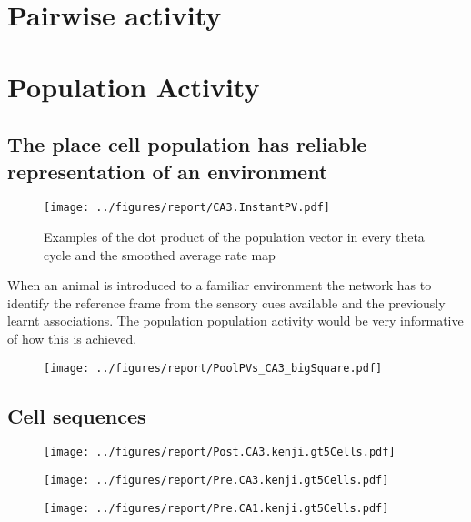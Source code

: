 \section{Pairwise activity}

\section{Population Activity}
\subsection*{The place cell population has reliable representation of an environment}

\begin{figure}[htb!]
\centering
\texttt{[image: ../figures/report/CA3.InstantPV.pdf]}
\caption{Examples of the dot product of the population vector in every theta cycle and the smoothed average rate map}
\end{figure}
When an animal is introduced to a familiar environment the network has to identify the reference frame from the sensory cues available and the previously learnt associations. The population population activity would be very informative of how this is achieved.

\begin{figure}[htb!]
\centering
\texttt{[image: ../figures/report/PoolPVs\_CA3\_bigSquare.pdf]}
\caption{}
\end{figure}

\subsection*{Cell sequences}
\begin{figure}[htb!]
\centering
\texttt{[image: ../figures/report/Post.CA3.kenji.gt5Cells.pdf]}
\caption{}
\end{figure}

\begin{figure}[htb!]
\centering
\texttt{[image: ../figures/report/Pre.CA3.kenji.gt5Cells.pdf]}
\caption{}
\end{figure}

\begin{figure}[htb!]
\centering
\texttt{[image: ../figures/report/Pre.CA1.kenji.gt5Cells.pdf]}
\caption{}
\end{figure}
\section{}
